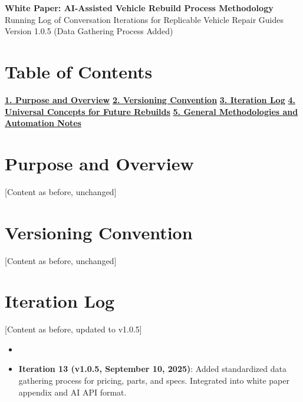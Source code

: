 \documentclass[a4paper,12pt]{article}
\begin{document}
\pagestyle{fancy}
\fancyhf{}
\renewcommand{\headrulewidth}{0.4pt}

\begin{center}
    {\Large\bfseries White Paper: AI-Assisted Vehicle Rebuild Process Methodology} \\
    {\large Running Log of Conversation Iterations for Replicable Vehicle Repair Guides} \\
    \vspace{0.5cm}
    Version 1.0.5 (Data Gathering Process Added)
\end{center}

\section*{Table of Contents}
\hyperref[sec:purpose]{\textbf{1. Purpose and Overview}} \newline
\hyperref[sec:versioning]{\textbf{2. Versioning Convention}} \newline
\hyperref[sec:iteration]{\textbf{3. Iteration Log}} \newline
\hyperref[sec:universal]{\textbf{4. Universal Concepts for Future Rebuilds}} \newline
\hyperref[sec:methodologies]{\textbf{5. General Methodologies and Automation Notes}} \newline

\section{Purpose and Overview}\label{sec:purpose}
[Content as before, unchanged]

\section{Versioning Convention}\label{sec:versioning}
[Content as before, unchanged]

\section{Iteration Log}\label{sec:iteration}
[Content as before, updated to v1.0.5]
\begin{itemize}
    \item [Previous iterations...]
    \item \textbf{Iteration 13 (v1.0.5, September 10, 2025)}: Added standardized data gathering process for pricing, parts, and specs. Integrated into white paper appendix and AI API format.
\end{itemize}
\end{document}
